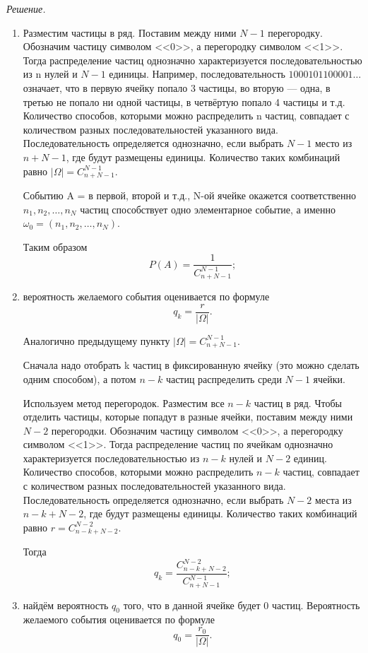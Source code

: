 \textit{Решение.}
\begin{enumerate}[label=\alph*)]
\item Разместим частицы в ряд.
Поставим между ними $ N - 1 $ перегородку.
Обозначим частицу символом <<0>>, а перегородку символом <<1>>.
Тогда распределение частиц однозначно характеризуется последовательностью из n нулей и $ N - 1 $ единицы.
Например, последовательность
$ 1000101100001 \dotsc $
означает, что в первую ячейку попало 3 частицы, во вторую --- одна, в третью не попало ни одной частицы, в четвёртую попало 4 частицы и т.д.
Количество способов, которыми можно распределить n частиц, совпадает с количеством разных последовательностей указанного вида.
Последовательность определяется однозначно, если выбрать $ N - 1 $ место из $ n + N - 1$, где будут размещены единицы.
Количество таких комбинаций равно $ | \Omega | = C_{n+N-1}^{N-1} $.

Событию A = { в первой, второй и т.д., N-ой ячейке окажется соответственно $ n_1, n_2, \dotsc , n_N $ частиц}
способствует одно элементарное событие, а именно
$ \omega_0 = \left( n_1, n_2, \dotsc , n_N \right) $.

Таким образом
$$ P(A) =
\frac{1}{C_{n+N-1}^{N-1}};$$

\item вероятность желаемого события оценивается по формуле
$$ q_k =
\frac{r}{| \Omega |}.$$

Аналогично предыдущему пункту $  | \Omega | = C_{n+N-1}^{N-1}  $.

Сначала надо отобрать k частиц в фиксированную ячейку (это можно сделать одним способом), а потом
$ n - k $
частиц распределить среди
$ N - 1 $ ячейки.

Используем метод перегородок.
Разместим все $ n - k $ частиц в ряд.
Чтобы отделить частицы, которые попадут в разные ячейки, поставим между ними $ N - 2 $ перегородки.
Обозначим частицу символом <<0>>, а перегородку символом <<1>>.
Тогда распределение частиц по ячейкам однозначно характеризуется последовательностью из $ n - k $ нулей и $ N - 2$ единиц.
Количество способов, которыми можно распределить
$ n - k $
частиц, совпадает с количеством разных последовательностей указанного вида.
Последовательность определяется однозначно, если выбрать $ N - 2 $ места из $ n - k + N - 2 $, где будут размещены единицы.
Количество таких комбинаций равно $ r = C_{n-k+N-2}^{N-2} $.

Тогда
$$ q_k =
\frac{C_{n-k+N-2}^{N-2}}{C_{n+N-1}^{N-1}};$$

\item найдём вероятность $ q_0 $ того, что в данной ячейке будет 0 частиц.
Вероятность желаемого события оценивается по формуле
$$ q_0 =
\frac{r_0}{| \Omega |}.$$


\end{enumerate}
